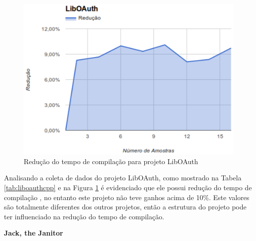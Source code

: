\begin{figure}[h]
    \centering
        \includegraphics[keepaspectratio=true,scale=1]{figuras/liboauth.eps}
    \caption{Redução do tempo de compilação para projeto LibOAuth}
    \label{liboauthcpp}
\end{figure}
Analisando a coleta de dados do projeto LibOAuth, como mostrado na Tabela \ref{tab:liboauthcpp} e na Figura \ref{liboauthcpp} é evidenciado que ele possui
 redução do tempo de compilação , no entanto este projeto não teve ganhos
 acima de 10\%. Este valores são totalmente diferentes dos outros projetos,
 então a estrutura do projeto pode ter influenciado na redução do
 tempo de compilação. 

\textbf{Jack, the Janitor}

